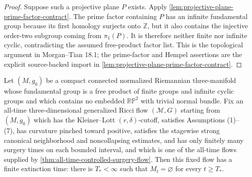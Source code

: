 \begin{proof}
Suppose such a projective plane $P$ exists.  Apply
\ref{lem:projective-plane-prime-factor-contract}.  The prime factor
containing $P$ has an infinite fundamental group because its first homology
surjects onto $\mathbb Z$, but it also contains the injective order-two
subgroup coming from $\pi _1(P)$.  It is therefore neither finite nor
infinite cyclic, contradicting the assumed free-product factor list.  This
is the topological argument in Morgan--Tian 18.1; the prime-factor and
Hempel assertions are the explicit source-backed import in
\ref{lem:projective-plane-prime-factor-contract}.
\end{proof}

\begin{theorem}
\label{thm:finite-time-extinction}
\notready
Let $(M,g_0)$ be a compact connected normalized Riemannian three-manifold
whose fundamental group is a free product of finite groups and infinite
cyclic groups and which contains no embedded $\mathbb{RP}^2$ with trivial
normal bundle.  Fix an all-time three-dimensional generalized Ricci flow
$({\mathcal M},G)$ starting from $(M,g_0)$ which has the
Kleiner--Lott $(r,\delta)$-cutoff, satisfies Assumptions (1)--(7), has
curvature pinched toward positive, satisfies the stagewise strong canonical
neighborhood and noncollapsing estimates, and has only finitely many surgery
times on each bounded interval, and which is one of the all-time flows
supplied by \ref{thm:all-time-controlled-surgery-flow}.  Then this fixed flow has a
finite extinction time: there is $T_*<\infty$ such that
$M_t=\varnothing$ for every $t\ge T_*$.
\end{theorem}

